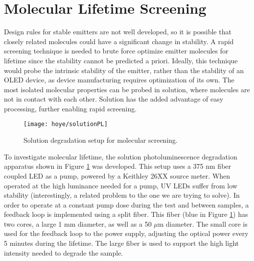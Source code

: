 \documentclass[../thesis.tex]{subfiles}
\begin{document}
\section{Molecular Lifetime Screening}\label{sec:hoye_solutionPL}
Design rules for stable emitters are not well developed, so it is possible that closely related molecules could have a significant change in stability.
A rapid screening technique is needed to brute force optimize emitter molecules for lifetime since the stability cannot be predicted a priori.
Ideally, this technique would probe the intrinsic stability of the emitter, rather than the stability of an OLED device, as device manufacturing requires optimization of its own.
The most isolated molecular properties can be probed in solution, where molecules are not in contact with each other.
Solution has the added advantage of easy processing, further enabling rapid screening.

\begin{figure}[ht]
\centering
\texttt{[image: hoye/solutionPL]}
\caption{Solution degradation setup for molecular screening.}
\label{fig:hoye_solutionPL}
\end{figure}

To investigate molecular lifetime, the solution photoluminescence degradation apparatus shown in Figure \ref{fig:hoye_solutionPL} was developed.
This setup uses a 375 nm fiber coupled LED as a pump, powered by a Keithley 26XX source meter.
When operated at the high luminance needed for a pump, UV LEDs suffer from low stability (interestingly, a related problem to the one we are trying to solve).
In order to operate at a constant pump dose during the test and between samples, a feedback loop is implemented using a split fiber.  
This fiber (blue in Figure \ref{fig:hoye_solutionPL}) has two cores, a large 1 mm diameter, as well as a 50 $\mu$m diameter.
The small core is used for the feedback loop to the power supply, adjusting the optical power every 5 minutes during the lifetime.
The large fiber is used to support the high light intensity needed to degrade the sample.
\end{document}

